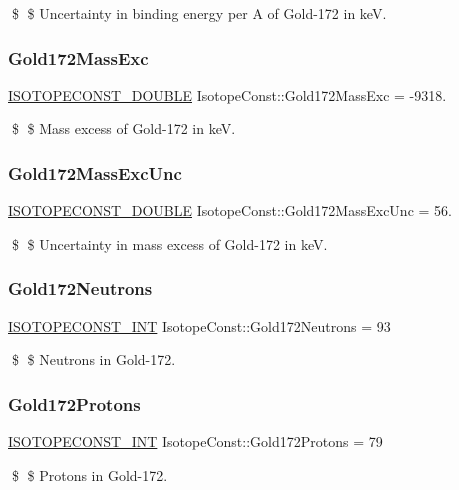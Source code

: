 \$ \$ Uncertainty in binding energy per A of Gold-\/172 in keV. \mbox{\label{group___isotope_const-_gold-_au172_ga6d119c3cfc234862848031f370a52991}} 
\subsubsection{\texorpdfstring{Gold172\+Mass\+Exc}{Gold172MassExc}}
{\footnotesize\ttfamily \mbox{\hyperlink{group___isotope_const-_macros_ga8f45a7272ce02c0b4c65c44636ed719a}{I\+S\+O\+T\+O\+P\+E\+C\+O\+N\+S\+T\+\_\+\+D\+O\+U\+B\+LE}} Isotope\+Const\+::\+Gold172\+Mass\+Exc = -\/9318.}

\$ \$ Mass excess of Gold-\/172 in keV. \mbox{\label{group___isotope_const-_gold-_au172_ga2acedb0ce5e77b4be9cc7f4379f94156}} 
\subsubsection{\texorpdfstring{Gold172\+Mass\+Exc\+Unc}{Gold172MassExcUnc}}
{\footnotesize\ttfamily \mbox{\hyperlink{group___isotope_const-_macros_ga8f45a7272ce02c0b4c65c44636ed719a}{I\+S\+O\+T\+O\+P\+E\+C\+O\+N\+S\+T\+\_\+\+D\+O\+U\+B\+LE}} Isotope\+Const\+::\+Gold172\+Mass\+Exc\+Unc = 56.}

\$ \$ Uncertainty in mass excess of Gold-\/172 in keV. \mbox{\label{group___isotope_const-_gold-_au172_gac527eae1d910968e58f0b042d4ce7fe8}} 
\subsubsection{\texorpdfstring{Gold172\+Neutrons}{Gold172Neutrons}}
{\footnotesize\ttfamily \mbox{\hyperlink{group___isotope_const-_macros_ga5f18360b3e99483a35c32d789e62621c}{I\+S\+O\+T\+O\+P\+E\+C\+O\+N\+S\+T\+\_\+\+I\+NT}} Isotope\+Const\+::\+Gold172\+Neutrons = 93}

\$ \$ Neutrons in Gold-\/172. \mbox{\label{group___isotope_const-_gold-_au172_ga51f933e004ecaa09270588e4619c8022}} 
\subsubsection{\texorpdfstring{Gold172\+Protons}{Gold172Protons}}
{\footnotesize\ttfamily \mbox{\hyperlink{group___isotope_const-_macros_ga5f18360b3e99483a35c32d789e62621c}{I\+S\+O\+T\+O\+P\+E\+C\+O\+N\+S\+T\+\_\+\+I\+NT}} Isotope\+Const\+::\+Gold172\+Protons = 79}

\$ \$ Protons in Gold-\/172. 